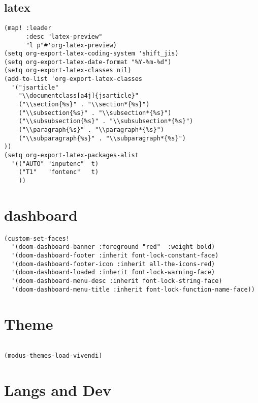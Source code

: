 \documentclass[11pt]{article}
\begin{document}
\subsection{latex}
\label{sec:orgf4676ae}
\begin{verbatim}
(map! :leader
      :desc "latex-preview"
      "l p"#'org-latex-preview)
(setq org-export-latex-coding-system 'shift_jis)
(setq org-export-latex-date-format "%Y-%m-%d")
(setq org-export-latex-classes nil)
(add-to-list 'org-export-latex-classes
  '("jsarticle"
    "\\documentclass[a4j]{jsarticle}"
    ("\\section{%s}" . "\\section*{%s}")
    ("\\subsection{%s}" . "\\subsection*{%s}")
    ("\\subsubsection{%s}" . "\\subsubsection*{%s}")
    ("\\paragraph{%s}" . "\\paragraph*{%s}")
    ("\\subparagraph{%s}" . "\\subparagraph*{%s}")
))
(setq org-export-latex-packages-alist
  '(("AUTO" "inputenc"  t)
    ("T1"   "fontenc"   t)
    ))

\end{verbatim}
\section{dashboard}
\label{sec:orgd852e35}
\begin{verbatim}
(custom-set-faces!
  '(doom-dashboard-banner :foreground "red"  :weight bold)
  '(doom-dashboard-footer :inherit font-lock-constant-face)
  '(doom-dashboard-footer-icon :inherit all-the-icons-red)
  '(doom-dashboard-loaded :inherit font-lock-warning-face)
  '(doom-dashboard-menu-desc :inherit font-lock-string-face)
  '(doom-dashboard-menu-title :inherit font-lock-function-name-face))
\end{verbatim}
\section{Theme}
\label{sec:org14465a9}
\begin{verbatim}

(modus-themes-load-vivendi)
\end{verbatim}
\section{Langs and Dev}
\label{sec:orgd8b0e1c}
\end{document}
